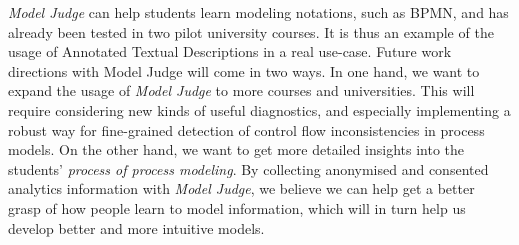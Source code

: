 

\emph{Model Judge} can help students learn modeling notations, such as BPMN, and
has already been tested in two pilot university courses. It is thus an example of
the usage of Annotated Textual Descriptions in a real use-case. Future
work directions with Model Judge will come in two ways. In one hand, we want to
expand the usage of \emph{Model Judge} to more courses and universities. This
will require considering new kinds of useful diagnostics, and especially
implementing a robust way for fine-grained detection of control flow
inconsistencies in process models. On the other hand, we want to get more
detailed insights into the students' \emph{process of process modeling}. By
collecting anonymised and consented analytics information with \emph{Model
  Judge}, we believe we can help get a better grasp of how people learn to model
information, which will in turn help us develop better and more intuitive
models.

